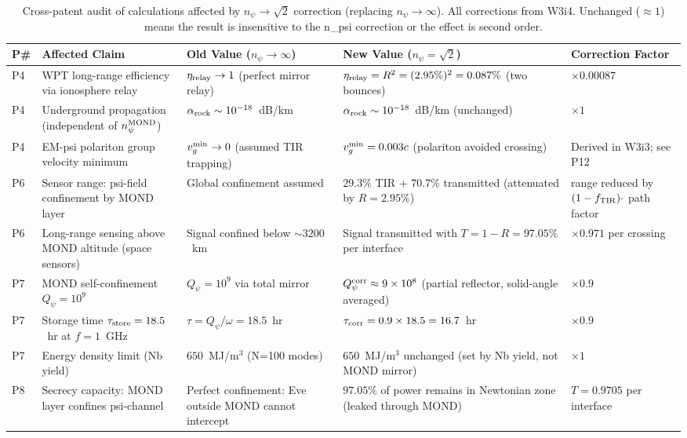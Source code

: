\documentclass[aps,prd,twocolumn,superscriptaddress]{revtex4-2}
\newcommand{\Qpsi}{Q_\psi}
\newcommand{\npsi}{n_\psi}
\newcommand{\ee}[1]{\times 10^{#1}}
\begin{document}
\begin{table}[ht]
\centering
\caption{Cross-patent audit of calculations affected by $\npsi \to \sqrt{2}$
correction (replacing $\npsi \to \infty$).  All corrections from W3i4.
Unchanged ($\approx 1$) means the result is insensitive to the n_psi
correction or the effect is second order.}
\label{tab:audit}
\begin{tabular}{p{0.5cm} p{2.5cm} p{4cm} p{3.5cm} p{2cm}}
\toprule
P\# & Affected Claim & Old Value ($\npsi \to \infty$) & New Value ($\npsi = \sqrt{2}$) & Correction Factor \\
\midrule
P4 & WPT long-range efficiency via ionosphere relay & $\eta_{\rm relay} \to 1$ (perfect mirror relay) & $\eta_{\rm relay} = R^2 = (2.95\%)^2 = 0.087\%$ (two bounces) & $\times 0.00087$ \\[2pt]
P4 & Underground propagation (independent of $\npsi^{\rm MOND}$) & $\alpha_{\rm rock} \sim 10^{-18}$~dB/km & $\alpha_{\rm rock} \sim 10^{-18}$~dB/km (unchanged) & $\times 1$ \\[2pt]
P4 & EM-psi polariton group velocity minimum & $v_g^{\rm min} \to 0$ (assumed TIR trapping) & $v_g^{\rm min} = 0.003c$ (polariton avoided crossing) & Derived in W3i3; see P12 \\[2pt]
P6 & Sensor range: psi-field confinement by MOND layer & Global confinement assumed & $29.3\%$ TIR + $70.7\%$ transmitted (attenuated by $R=2.95\%$) & range reduced by $(1-f_{\rm TIR}) \cdot$ path factor \\[2pt]
P6 & Long-range sensing above MOND altitude (space sensors) & Signal confined below $\sim 3200$~km & Signal transmitted with $T = 1-R = 97.05\%$ per interface & $\times 0.971$ per crossing \\[2pt]
P7 & MOND self-confinement $\Qpsi = 10^9$ & $\Qpsi = 10^9$ via total mirror & $\Qpsi^{\rm corr} \approx 9\ee8$ (partial reflector, solid-angle averaged) & $\times 0.9$ \\[2pt]
P7 & Storage time $\tau_{\rm store} = 18.5$~hr at $f=1$~GHz & $\tau = \Qpsi/\omega = 18.5$~hr & $\tau_{\rm corr} = 0.9 \times 18.5 = 16.7$~hr & $\times 0.9$ \\[2pt]
P7 & Energy density limit (Nb yield) & $650$~MJ/m$^3$ (N=100 modes) & $650$~MJ/m$^3$ unchanged (set by Nb yield, not MOND mirror) & $\times 1$ \\[2pt]
P8 & Secrecy capacity: MOND layer confines psi-channel & Perfect confinement: Eve outside MOND cannot intercept & $97.05\%$ of power remains in Newtonian zone (leaked through MOND) & $T = 0.9705$ per interface \\[2pt]

\end{tabular}
\end{table}
\end{document}
